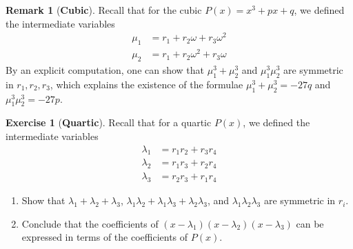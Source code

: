 \documentclass[reqno, 12pt, letter]{article}
\theoremstyle{plain}
\theoremstyle{definition}
\newtheorem{remark}[theorem]{Remark}
\newtheorem{exercise}[theorem]{Exercise}
\theoremstyle{remark}
\numberwithin{equation}{section}
\begin{document}
\begin{remark}[\textbf{Cubic}] Recall that for the cubic $ P(x)=x^3 + px + q$, we defined the intermediate variables
	\begin{align*}
		\mu_1 & = r_1 + r_2 \omega + r_3 \omega^2 \\
		\mu_2 & = r_1 + r_2 \omega^2 + r_3 \omega
	\end{align*}
	By an explicit computation, one can show that $ \mu_1^3 + \mu_2^3$ and $\mu_1^3  \mu_2^3$ are symmetric in $ r_1, r_2, r_3$, which explains the existence of the formulae $ \mu_1^3 + \mu_2^3 = -27q$ and $ \mu_1^3 \mu_2^3 = -27p$.
\end{remark}

\begin{exercise}[\textbf{Quartic}]
	\label{exercise:quartic-lambda}
	Recall that for a quartic $ P(x)$, we defined the intermediate variables
	\begin{align*}
		\lambda_1 & = r_1 r_2 + r_3 r_4 \\
		\lambda_2 & = r_1 r_3 + r_2 r_4 \\
		\lambda_3 & = r_2 r_3 + r_1 r_4
	\end{align*}
	\begin{enumerate}
		\item Show that $ \lambda_1 + \lambda_2 + \lambda_3$, $ \lambda_1 \lambda_2 + \lambda_1 \lambda_3 + \lambda_2 \lambda_3$, and $ \lambda_1 \lambda_2 \lambda_3$ are symmetric in $r_i$.
		\item Conclude that the coefficients of $ (x-\lambda_1)(x-\lambda_2)(x-\lambda_3)$ can be expressed in terms of the coefficients of $ P(x)$.
	\end{enumerate}
\end{exercise}
\end{document}
